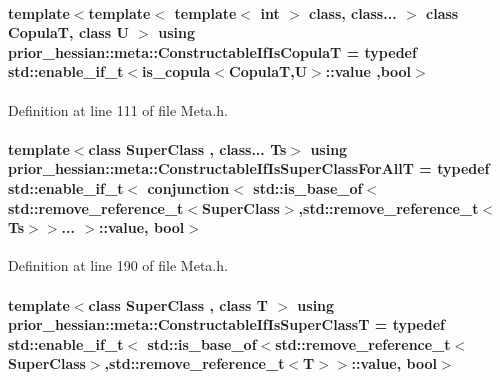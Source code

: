 \paragraph[{\texorpdfstring{Constructable\+If\+Is\+CopulaT}{ConstructableIfIsCopulaT}}]{\setlength{\rightskip}{0pt plus 5cm}template$<$template$<$ template$<$ int $>$ class, class... $>$ class CopulaT, class U $>$ using {\bf prior\+\_\+hessian\+::meta\+::\+Constructable\+If\+Is\+CopulaT} = typedef std\+::enable\+\_\+if\+\_\+t$<${\bf is\+\_\+copula}$<$CopulaT,U$>$\+::value ,bool$>$}\hypertarget{namespaceprior__hessian_1_1meta_a18d532e255e9785cca33c9bf8b932adf}{}\label{namespaceprior__hessian_1_1meta_a18d532e255e9785cca33c9bf8b932adf}


Definition at line 111 of file Meta.\+h.

\paragraph[{\texorpdfstring{Constructable\+If\+Is\+Super\+Class\+For\+AllT}{ConstructableIfIsSuperClassForAllT}}]{\setlength{\rightskip}{0pt plus 5cm}template$<$class Super\+Class , class... Ts$>$ using {\bf prior\+\_\+hessian\+::meta\+::\+Constructable\+If\+Is\+Super\+Class\+For\+AllT} = typedef std\+::enable\+\_\+if\+\_\+t$<$ {\bf conjunction}$<$ std\+::is\+\_\+base\+\_\+of$<$std\+::remove\+\_\+reference\+\_\+t$<$Super\+Class$>$,std\+::remove\+\_\+reference\+\_\+t$<$Ts$>$$>$... $>$\+::value, bool$>$}\hypertarget{namespaceprior__hessian_1_1meta_a4e077ce0021239d133049cf40e8f163e}{}\label{namespaceprior__hessian_1_1meta_a4e077ce0021239d133049cf40e8f163e}


Definition at line 190 of file Meta.\+h.

\paragraph[{\texorpdfstring{Constructable\+If\+Is\+Super\+ClassT}{ConstructableIfIsSuperClassT}}]{\setlength{\rightskip}{0pt plus 5cm}template$<$class Super\+Class , class T $>$ using {\bf prior\+\_\+hessian\+::meta\+::\+Constructable\+If\+Is\+Super\+ClassT} = typedef std\+::enable\+\_\+if\+\_\+t$<$ std\+::is\+\_\+base\+\_\+of$<$std\+::remove\+\_\+reference\+\_\+t$<$Super\+Class$>$,std\+::remove\+\_\+reference\+\_\+t$<$T$>$$>$\+::value, bool$>$}\hypertarget{namespaceprior__hessian_1_1meta_ac41c6affb6f4ae3fb6ea0abd23a3b10d}{}\label{namespaceprior__hessian_1_1meta_ac41c6affb6f4ae3fb6ea0abd23a3b10d}


